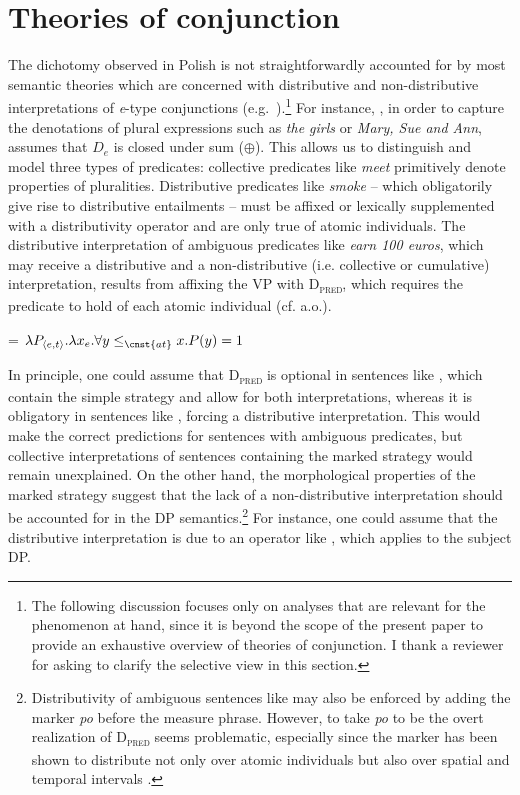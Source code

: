 \documentclass[output=paper]{langscibook}
\begin{document}
\section{Theories of conjunction}\label{ros:sec:2}

The dichotomy observed in Polish is not straightforwardly accounted for by most semantic theories which are concerned with distributive and non-distributive interpretations of \textit{e}-type conjunctions (e.g.~\citealt{Link:1983, Partee:1983, Landman:1989, Krifka:1990, Schein:1993, Schein:2017, Schwarzschild:1996}).\footnote{The following discussion focuses only on analyses that are relevant for the phenomenon at hand, since it is beyond the scope of the present paper to provide an exhaustive overview of theories of conjunction. I thank a reviewer for asking to clarify the selective view in this section.} For instance, \citet{Link:1983}, in order to capture the denotations of plural expressions such as \textit{the girls} or \textit{Mary, Sue and Ann}, assumes that $D_{e}$ is closed under sum ($\oplus$). This allows us to distinguish and model three types of predicates: collective predicates like \textit{meet} primitively denote properties of pluralities. Distributive predicates like \textit{smoke} -- which obligatorily give rise to distributive entailments -- must be affixed or lexically supplemented with a distributivity operator and are only true of atomic individuals. The distributive interpretation of ambiguous predicates like \textit{earn 100 euros}, which may receive a distributive and a non-distributive (i.e. collective or cumulative) interpretation, results from affixing the VP with \textsc{D\textsubscript{pred}}, which requires the predicate to hold of each atomic individual (cf. \citealt{Link:1987} a.o.).

\ea\label{ros:d1}
 = $\lambda P_{\langle e,t \rangle}. \lambda x_{e}. \forall y \le_{\cnst{at}} x.P(y) = 1$ 
\z

\noindent In principle, one could assume that \textsc{D\textsubscript{pred}} is optional in sentences like , which contain the simple strategy and allow for both interpretations, whereas it is obligatory in sentences like , forcing a distributive interpretation. This would make the correct predictions for sentences with ambiguous predicates, but collective interpretations of sentences containing the marked strategy would remain unexplained. On the other hand, the morphological properties of the marked strategy suggest that the lack of a non-distributive interpretation should be accounted for in the DP semantics.\footnote{Distributivity of ambiguous sentences like  may also be enforced by adding the marker \textit{po} before the measure phrase. However, to take \textit{po} to be the overt realization of \textsc{D\textsubscript{pred}} seems problematic, especially since the marker has been shown to distribute not only over atomic individuals but also over spatial and temporal intervals \citep{Przepiorkowski:2014, Champollion:2016Overt}.} For instance, one could assume that the distributive interpretation is due to an operator like , which applies to the subject DP.
\end{document}
